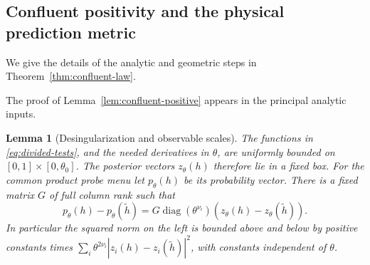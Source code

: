 \documentclass[11pt]{amsart}
\newtheorem{lemma}[theorem]{Lemma}
\theoremstyle{definition}\newtheorem{definition}[theorem]{Definition}
\theoremstyle{remark}\newtheorem{remark}[theorem]{Remark}
\begin{document}
\subsection{Confluent positivity and the physical prediction metric}
We give the details of the analytic and geometric steps in
Theorem~\ref{thm:confluent-law}.

The proof of Lemma~\ref{lem:confluent-positive} appears in the principal analytic inputs.

\begin{lemma}[Desingularization and observable scales]\label{lem:observable-scales}
The functions in \eqref{eq:divided-tests}, and the needed derivatives in
$\theta$, are uniformly bounded on $[0,1]\times[0,\theta_0]$.
The posterior vectors $z_\theta(h)$ therefore lie in a fixed box.
For the common product probe menu let $p_\theta(h)$ be its probability
vector. There is a fixed matrix $G$ of full column rank such that
\begin{equation}\label{eq:physical-metric}
 p_\theta(h)-p_\theta(\widetilde h)
    =G\operatorname{diag}(\theta^{\nu_i})
          (z_\theta(h)-z_\theta(\widetilde h)).
\end{equation}
In particular the squared norm on the left is bounded above and below
by positive constants times
$\sum_i\theta^{2\nu_i}|z_i(h)-z_i(\widetilde h)|^2$,
with constants independent of $\theta$.
\end{lemma}
\end{document}
